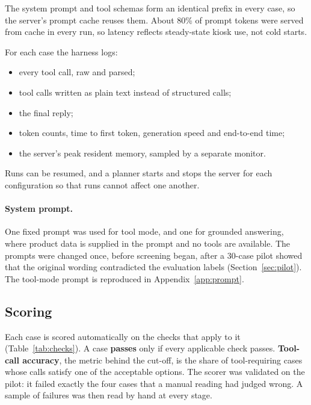 \documentclass[11pt,a4paper]{article}
\begin{document}
The system prompt and tool schemas form an identical prefix in every case, so the server's prompt cache reuses them.
About 80\% of prompt tokens were served from cache in every run, so latency reflects steady-state kiosk use, not cold
starts.

For each case the harness logs:
\begin{itemize}
  \item every tool call, raw and parsed;
  \item tool calls written as plain text instead of structured calls;
  \item the final reply;
  \item token counts, time to first token, generation speed and end-to-end time;
  \item the server's peak resident memory, sampled by a separate monitor.
\end{itemize}
Runs can be resumed, and a planner starts and stops the server for each configuration so that runs cannot affect one
another.

\paragraph{System prompt.} One fixed prompt was used for tool mode, and one for grounded answering, where product data
is supplied in the prompt and no tools are available. The prompts were changed once, before screening began, after a
30-case pilot showed that the original wording contradicted the evaluation labels (Section~\ref{sec:pilot}). The
tool-mode prompt is reproduced in Appendix~\ref{app:prompt}.

\subsection{Scoring}\label{sec:scoring}
Each case is scored automatically on the checks that apply to it (Table~\ref{tab:checks}). A case \textbf{passes} only
if every applicable check passes. \textbf{Tool-call accuracy}, the metric behind the cut-off, is the share of
tool-requiring cases whose calls satisfy one of the acceptable options. The scorer was validated on the pilot: it failed
exactly the four cases that a manual reading had judged wrong. A sample of failures was then read by hand at every stage.
\end{document}
